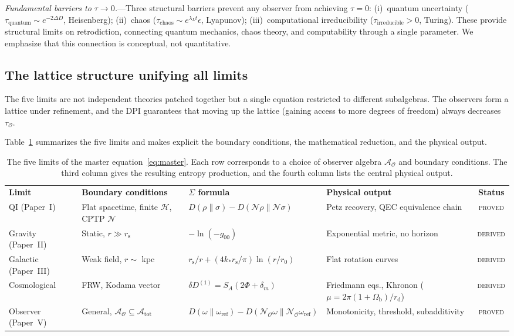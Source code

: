\documentclass[prd,twocolumn,superscriptaddress,longbibliography,floatfix]{revtex4-2}
\newcommand{\chan}{\mathcal{N}}
\newcommand{\hilb}{\mathcal{H}}
\newcommand{\KL}{D}
\newcommand{\tauasym}{\tau}
\newcommand{\rs}{r_{\mathrm{s}}}
\newcommand{\Aobs}{\mathcal{A}_{\mathcal{O}}}
\newcommand{\Atot}{\mathcal{A}_{\mathrm{tot}}}
\newcommand{\tauO}{\tauasym_{\mathcal{O}}}
\begin{document}
\emph{Fundamental barriers to $\tauasym \to 0$.}---Three
structural barriers prevent any observer from achieving
$\tauasym = 0$:
(i)~quantum uncertainty ($\tauasym_{\mathrm{quantum}}
\sim e^{-2\Delta D}$, Heisenberg);
(ii)~chaos ($\tauasym_{\mathrm{chaos}} \sim
e^{\lambda_L t}\epsilon$, Lyapunov);
(iii)~computational irreducibility
($\tauasym_{\mathrm{irreducible}} > 0$, Turing).
These provide structural limits on retrodiction,
connecting quantum mechanics, chaos theory, and
computability through a single parameter.  We
emphasize that this connection is conceptual,
not quantitative.


\subsection{The lattice structure unifying all limits}
\label{sec:lattice_unification}

The five limits are not independent theories patched
together but a single equation restricted to different
subalgebras.  The observers form a lattice under
refinement, and the DPI guarantees that moving up the
lattice (gaining access to more degrees of freedom)
always decreases $\tauO$.

Table~\ref{tab:limits} summarizes the five limits
and makes explicit the boundary conditions, the
mathematical reduction, and the physical
output.

\begin{table}[t]
\caption{\label{tab:limits}The five limits of
the master equation~\eqref{eq:master}.  Each
row corresponds to a choice of observer algebra
$\Aobs$ and boundary conditions.  The third column
gives the resulting entropy production, and the
fourth column lists the central physical output.}
\begin{ruledtabular}
\begin{tabular}{llllc}
\textbf{Limit} &
\textbf{Boundary conditions} &
\textbf{$\Sigma$ formula} &
\textbf{Physical output} &
\textbf{Status} \\
\colrule
QI (Paper~I) &
Flat spacetime, finite $\hilb$, CPTP $\chan$ &
$\KL(\rho\|\sigma) - \KL(\chan\rho\|\chan\sigma)$ &
Petz recovery, QEC equivalence chain &
\textsc{proved} \\
Gravity (Paper~II) &
Static, $r \gg \rs$ &
$-\ln(-g_{00})$ &
Exponential metric, no horizon &
\textsc{derived} \\
Galactic (Paper~III) &
Weak field, $r \sim$ kpc &
$\rs/r + (4k_*\rs/\pi)\ln(r/r_0)$ &
Flat rotation curves &
\textsc{derived} \\
Cosmological &
FRW, Kodama vector &
$\delta D^{(1)} = S_A(2\Phi + \delta_m)$ &
Friedmann eqs., Khronon ($\mu = 2\pi(1\!+\!\Omega_{\mathrm{b}})/r_{\mathrm{d}}$) &
\textsc{derived} \\
Observer (Paper~V) &
General, $\Aobs \subseteq \Atot$ &
$\KL(\omega\|\omega_{\mathrm{ref}}) -
\KL(\chan_{\!\mathcal{O}}\omega\|
\chan_{\!\mathcal{O}}\omega_{\mathrm{ref}})$ &
Monotonicity, threshold, subadditivity &
\textsc{proved} \\
\end{tabular}
\end{ruledtabular}
\end{table}
\end{document}
